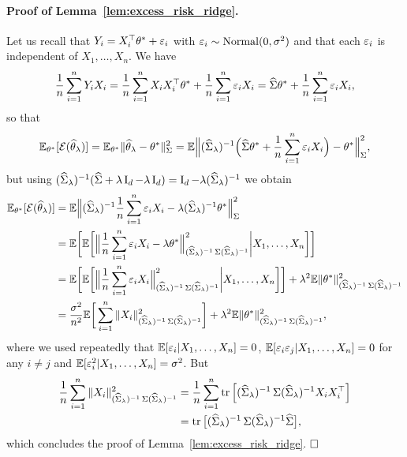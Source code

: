 \paragraph{Proof of Lemma~\ref{lem:excess_risk_ridge}.}

Let us recall that $Y_i = X_i^\top \theta^* + \eps_i$ with $\eps_i \sim \nor(0, \sigma^2)$ and that each $\eps_i$ is independent of $X_1, \ldots, X_n$.
We have
\begin{equation*}
	\frac 1n \sum_{i=1}^n Y_i X_i = \frac 1n \sum_{i=1}^n X_i X_i^\top \theta^* 
	+ \frac 1n \sum_{i=1}^n \eps_i X_i = \wh \bSigma \theta^* + \frac 1n \sum_{i=1}^n \eps_i X_i,
\end{equation*}
so that
\begin{equation*}
	\E_{\theta^*} [\cE(\wh \theta_\lambda)] 
	=  \E_{\theta^*} \norm{\wh \theta_\lambda - \theta^*}_{\bSigma}^2 
	= \E \Big\| (\wh \bSigma_\lambda)^{-1} \Big(\wh \bSigma \theta^* + \frac 1n \sum_{i=1}^n \eps_i X_i \Big) - \theta^* \Big\|_{\bSigma}^2,
\end{equation*}
but using $(\wh \bSigma_\lambda)^{-1} (\wh \bSigma + \lambda \bI_d - \lambda \bI_d) = \bI_d - \lambda 
(\wh \bSigma_\lambda)^{-1}$ we obtain
\begin{align*}
	\E_{\theta^*} [\cE(\wh \theta_\lambda)] &= \E \Big\| (\wh \bSigma_\lambda)^{-1} \frac 1n \sum_{i=1}^n \eps_i X_i - \lambda (\wh \bSigma_\lambda)^{-1} \theta^* \Big\|_{\bSigma}^2 \\
	&= \E \bigg[ \E \bigg[ \Big\| \frac 1n \sum_{i=1}^n \eps_i X_i - \lambda \theta^* \Big\|_{(\wh \bSigma_\lambda)^{-1} \bSigma (\wh \bSigma_\lambda)^{-1}}^2 \bigg| X_1, \ldots, X_n \bigg] \bigg] \\
	&= \E \bigg[ \E \bigg[ \Big\| \frac 1n \sum_{i=1}^n \eps_i X_i \Big\|_{(\wh \bSigma_\lambda)^{-1} \bSigma (\wh \bSigma_\lambda)^{-1}}^2 \bigg| X_1, \ldots, X_n \bigg] \bigg]  + \lambda^2 \E \norm{\theta^*}_{(\wh \bSigma_\lambda)^{-1} \bSigma (\wh \bSigma_\lambda)^{-1}}^2 \\
	&= \frac{\sigma^2}{n^2} \E \bigg[ \sum_{i=1}^n \norm{X_i}_{(\wh \bSigma_\lambda)^{-1} \bSigma (\wh \bSigma_\lambda)^{-1}}^2 \bigg]  + \lambda^2 \E \norm{\theta^*}_{(\wh \bSigma_\lambda)^{-1} \bSigma (\wh \bSigma_\lambda)^{-1}}^2,
\end{align*}
where we used repeatedly that $\E[\eps_i | X_1, \ldots, X_n] = 0$, $\E[\eps_i \eps_j | X_1, \ldots, X_n] = 0$ for any $i \neq j$ and $\E[\eps_i^2 | X_1, \ldots, X_n] = \sigma^2$.
But 
\begin{align*}
	\frac 1n \sum_{i=1}^n \norm{X_i}_{(\wh \bSigma_\lambda)^{-1} \bSigma (\wh \bSigma_\lambda)^{-1}}^2 
	&= \frac 1n \sum_{i=1}^n \tr \Big[ (\wh \bSigma_\lambda)^{-1} \bSigma (\wh \bSigma_\lambda)^{-1} X_i X_i^\top \Big] \\
	&= \tr \big[ (\wh \bSigma_\lambda)^{-1} \bSigma (\wh \bSigma_\lambda)^{-1} \wh \bSigma \big],
\end{align*}
which concludes the proof of Lemma~\ref{lem:excess_risk_ridge}. $\hfill \square$

